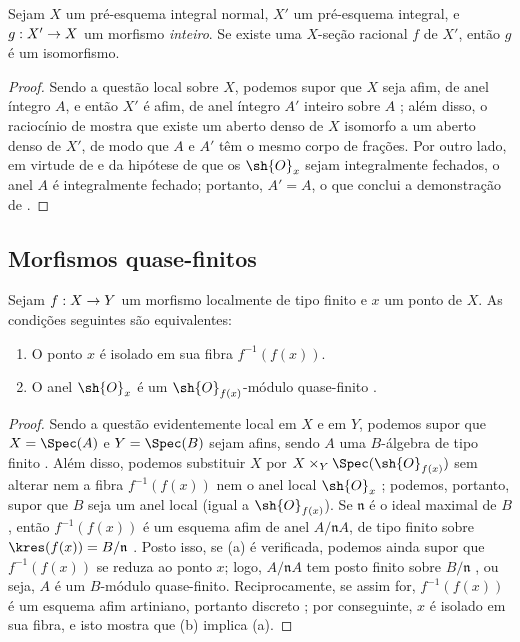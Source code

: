 \documentclass[oneside,10pt]{amsart}
\makeatletter
\newcommand{\ega@arrow}[2]{\mathchoice{#1}{#2}{#2}{#2}}
\renewcommand{\to}{\ega@arrow{\longrightarrow}{\rightarrow}}
\newcommand{\oldpage}[2][]{\marginnote{\normalfont\footnotesize\textbf{#1}~|~#2}\ignorespaces}
\let\EGAOriginalLabel\label
\renewcommand{\label}[1]{\phantomsection\EGAOriginalLabel{#1}}
\makeatother
\begin{document}
\begin{corollary}[6.1.15]
\label{II.6.1.15}
Sejam $X$ um pré-esquema integral normal, $X'$ um pré-esquema integral, e $g:X'\to X$ um morfismo \emph{inteiro}.
Se existe uma $X$-seção racional $f$ de $X'$, então $g$ é um isomorfismo.
\end{corollary}

\begin{proof}
Sendo a questão local sobre $X$, podemos supor que $X$ seja afim, de anel íntegro $A$, e então $X'$ é afim, de anel íntegro $A'$ inteiro sobre $A$ ;
além disso, o raciocínio de  mostra que existe um aberto denso de $X$ isomorfo a um aberto denso de $X'$, de modo que $A$ e $A'$ têm o mesmo corpo de frações.
Por outro lado, em virtude de  e da hipótese de que os $\sh{O}_x$ sejam integralmente fechados, o anel $A$ é integralmente fechado;
portanto, $A'=A$, o que conclui a demonstração de .
\end{proof}

\subsection{Morfismos quase-finitos}
\label{subsection:II.6.2}

\begin{proposition}[6.2.1]
\label{II.6.2.1}
Sejam $f:X\to Y$ um morfismo localmente de tipo finito e $x$ um ponto de $X$.
As condições seguintes são equivalentes:
\oldpage[II]{115}
\begin{enumerate}
  \item[\rm{(a)}] O ponto $x$ é isolado em sua fibra $f^{-1}(f(x))$.
  \item[\rm{(b)}] O anel $\sh{O}_x$ é um $\sh{O}_{f(x)}$-módulo quase-finito .
\end{enumerate}
\end{proposition}

\begin{proof}
Sendo a questão evidentemente local em $X$ e em $Y$, podemos supor que $X=\Spec(A)$ e $Y=\Spec(B)$ sejam afins, sendo $A$ uma $B$-álgebra de tipo finito .
Além disso, podemos substituir $X$ por $X\times_Y\Spec(\sh{O}_{f(x)})$ sem alterar nem a fibra $f^{-1}(f(x))$ nem o anel local $\sh{O}_x$ ;
podemos, portanto, supor que $B$ seja um anel local (igual a $\sh{O}_{f(x)}$).
Se $\mathfrak{n}$ é o ideal maximal de $B$, então $f^{-1}(f(x))$ é um esquema afim de anel $A/\mathfrak{n}A$, de tipo finito sobre $\kres(f(x))=B/\mathfrak{n}$ .
Posto isso, se (a) é verificada, podemos ainda supor que $f^{-1}(f(x))$ se reduza ao ponto $x$;
logo, $A/\mathfrak{n}A$ tem posto finito sobre $B/\mathfrak{n}$ , ou seja, $A$ é um $B$-módulo quase-finito.
Reciprocamente, se assim for, $f^{-1}(f(x))$ é um esquema afim artiniano, portanto discreto ;
por conseguinte, $x$ é isolado em sua fibra, e isto mostra que (b) implica (a).
\end{proof}
\end{document}

